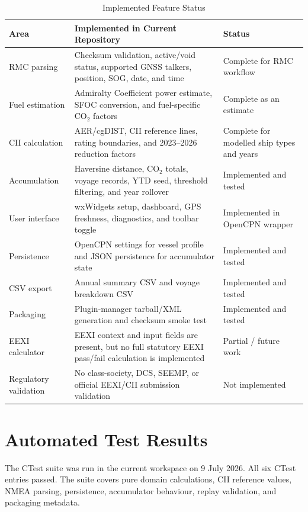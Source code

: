 \begin{table}[H]
    \centering
    \small
    \caption{Implemented Feature Status}
    \label{tab:implemented-features}
    \begin{tabularx}{\textwidth}{lXX}
        \toprule
        \textbf{Area} & \textbf{Implemented in Current Repository} & \textbf{Status} \\
        \midrule
        RMC parsing & Checksum validation, active/void status, supported GNSS talkers, position, SOG, date, and time & Complete for RMC workflow \\
        Fuel estimation & Admiralty Coefficient power estimate, SFOC conversion, and fuel-specific CO$_2$ factors & Complete as an estimate \\
        CII calculation & AER/cgDIST, CII reference lines, rating boundaries, and 2023--2026 reduction factors & Complete for modelled ship types and years \\
        Accumulation & Haversine distance, CO$_2$ totals, voyage records, YTD seed, threshold filtering, and year rollover & Implemented and tested \\
        User interface & wxWidgets setup, dashboard, GPS freshness, diagnostics, and toolbar toggle & Implemented in OpenCPN wrapper \\
        Persistence & OpenCPN settings for vessel profile and JSON persistence for accumulator state & Implemented and tested \\
        CSV export & Annual summary CSV and voyage breakdown CSV & Implemented and tested \\
        Packaging & Plugin-manager tarball/XML generation and checksum smoke test & Implemented and tested \\
        EEXI calculator & EEXI context and input fields are present, but no full statutory EEXI pass/fail calculation is implemented & Partial / future work \\
        Regulatory validation & No class-society, DCS, SEEMP, or official EEXI/CII submission validation & Not implemented \\
        \bottomrule
    \end{tabularx}
\end{table}

\section{Automated Test Results}
The CTest suite was run in the current workspace on 9 July 2026. All six CTest entries passed. The suite covers pure domain calculations, CII reference values, NMEA parsing, persistence, accumulator behaviour, replay validation, and packaging metadata.

